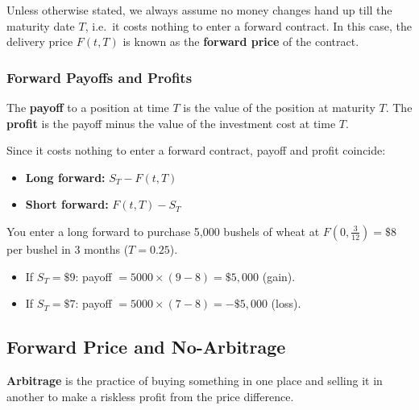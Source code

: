 \begin{sidenote}
  Unless otherwise stated, we always assume no money changes hand up till the maturity date $T$, i.e.\ it costs nothing to enter a forward contract. In this case, the delivery price $F(t,T)$ is known as the \textbf{forward price} of the contract.
\end{sidenote}

\subsubsection{Forward Payoffs and Profits}

\begin{definition}
  The \textbf{payoff} to a position at time $T$ is the value of the position at maturity $T$. The \textbf{profit} is the payoff minus the value of the investment cost at time $T$.

  Since it costs nothing to enter a forward contract, payoff and profit coincide:
  \begin{itemize}
    \item \textbf{Long forward:} $S_T - F(t,T)$
    \item \textbf{Short forward:} $F(t,T) - S_T$
  \end{itemize}
\end{definition}

\begin{example}
  You enter a long forward to purchase 5{,}000 bushels of wheat at $F(0,\tfrac{3}{12}) = \$8$ per bushel in 3 months ($T = 0.25$).
  \begin{itemize}
    \item If $S_T = \$9$: payoff $= 5000 \times (9-8) = \$5{,}000$ (gain).
    \item If $S_T = \$7$: payoff $= 5000 \times (7-8) = -\$5{,}000$ (loss).
  \end{itemize}
\end{example}

\subsection{Forward Price and No-Arbitrage}

\begin{definition}[Arbitrage]
  \textbf{Arbitrage} is the practice of buying something in one place and selling it in another to make a riskless profit from the price difference.
\end{definition}

